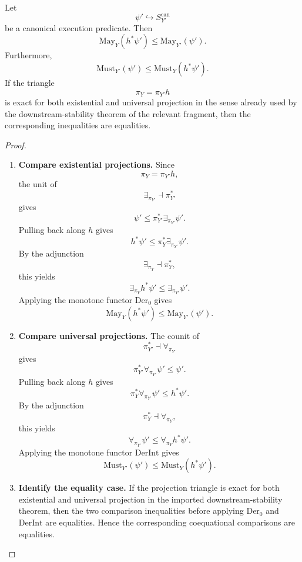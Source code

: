 \begin{proposition}
\label{prop:downstream-comparison-coequational-projections}
Let
\[
  \psi'\hookrightarrow S^{\mathrm{can}}_{Y'}
\]
be a canonical execution predicate.  Then
\[
  \mathrm{May}_Y(h^*\psi')
  \leq
  \mathrm{May}_{Y'}(\psi').
\]
Furthermore,
\[
  \mathrm{Must}_{Y'}(\psi')
  \leq
  \mathrm{Must}_Y(h^*\psi').
\]
If the triangle
\[
  \pi_Y=\pi_{Y'}h
\]
is exact for both existential and universal projection in the sense already
used by the downstream-stability theorem of the relevant fragment, then the
corresponding inequalities are equalities.
\end{proposition}

\begin{proof}
\leavevmode
\begin{enumerate}
  \item \textbf{Compare existential projections.}
  Since
  \[
    \pi_Y=\pi_{Y'}h,
  \]
  the unit of
  \[
    \exists_{\pi_{Y'}}\dashv \pi_{Y'}^*
  \]
  gives
  \[
    \psi'\leq
    \pi_{Y'}^*\exists_{\pi_{Y'}}\psi'.
  \]
  Pulling back along \(h\) gives
  \[
    h^*\psi'
    \leq
    \pi_Y^*\exists_{\pi_{Y'}}\psi'.
  \]
  By the adjunction
  \[
    \exists_{\pi_Y}\dashv \pi_Y^*,
  \]
  this yields
  \[
    \exists_{\pi_Y}h^*\psi'
    \leq
    \exists_{\pi_{Y'}}\psi'.
  \]
  Applying the monotone functor \(\mathrm{Der}_0\) gives
  \[
    \mathrm{May}_Y(h^*\psi')
    \leq
    \mathrm{May}_{Y'}(\psi').
  \]

  \item \textbf{Compare universal projections.}
  The counit of
  \[
    \pi_{Y'}^*\dashv\forall_{\pi_{Y'}}
  \]
  gives
  \[
    \pi_{Y'}^*\forall_{\pi_{Y'}}\psi'
    \leq
    \psi'.
  \]
  Pulling back along \(h\) gives
  \[
    \pi_Y^*\forall_{\pi_{Y'}}\psi'
    \leq
    h^*\psi'.
  \]
  By the adjunction
  \[
    \pi_Y^*\dashv\forall_{\pi_Y},
  \]
  this yields
  \[
    \forall_{\pi_{Y'}}\psi'
    \leq
    \forall_{\pi_Y}h^*\psi'.
  \]
  Applying the monotone functor \(\mathrm{DerInt}\) gives
  \[
    \mathrm{Must}_{Y'}(\psi')
    \leq
    \mathrm{Must}_Y(h^*\psi').
  \]

  \item \textbf{Identify the equality case.}
  If the projection triangle is exact for both existential and universal
  projection in the imported downstream-stability theorem, then the two
  comparison inequalities before applying \(\mathrm{Der}_0\) and
  \(\mathrm{DerInt}\) are equalities.  Hence the corresponding
  coequational comparisons are equalities.
\end{enumerate}
\end{proof}

